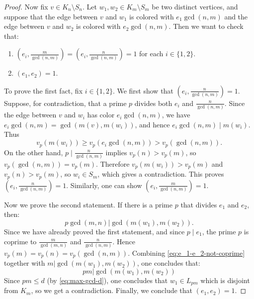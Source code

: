 \documentclass[11pt]{amsart}
\theoremstyle{remark}
\begin{document}
\begin{proof}
  
  Now fix $v\in K_n\setminus S_n$. Let $w_1,w_2\in K_m\setminus S_m$ be two distinct vertices, and suppose that the edge between $v$ and $w_1$ is colored with $e_1\gcd(n,m)$ and the edge between $v$ and $w_2$ is colored with $e_2\gcd(n,m)$. Then we want to check that:
  \begin{enumerate}
    \item $(e_i, \frac{m}{\gcd(n,m)}) = (e_i, \frac{n}{\gcd(n,m)}) = 1$ for each $i \in \{1, 2\}$.
    \item $(e_1, e_2) = 1$.
  \end{enumerate}
  To prove the first fact, fix $i\in\{1,2\}$. We first show that $(e_i,\frac{n}{\gcd(n,m)})=1$. Suppose, for contradiction, that a prime $p$ divides both $e_i$ and $\frac{n}{\gcd(n,m)}$. Since the edge between $v$ and $w_i$ has color $e_i\gcd(n,m)$, we have $e_i\gcd(n,m)=\gcd(m(v),m(w_i))$, and hence $e_i\gcd(n,m)\mid m(w_i)$. Thus
  \[
    v_p(m(w_i))\geq v_p(e_i\gcd(n,m))>v_p(\gcd(n,m)).
  \]
  On the other hand, $p\mid \frac{n}{\gcd(n,m)}$ implies $v_p(n)>v_p(m)$, so $v_p(\gcd(n,m))=v_p(m)$. Therefore $v_p(m(w_i))>v_p(m)$ and $v_p(n)>v_p(m)$, so $w_i\in S_m$, which gives a contradiction. This proves $(e_i,\frac{n}{\gcd(n,m)})=1$. Similarly, one can show $(e_i,\frac{m}{\gcd(n,m)})=1$.

  Now we prove the second statement. If there is a prime $p$ that divides $e_1$ and $e_2$, then: 
  \begin{equation} \label{eq:e_1-e_2-not-coprime}
    p \gcd(m,n) | \gcd(m(w_1), m(w_2)).
  \end{equation}
  Since we have already proved the first statement, and since $p\mid e_1$, the prime $p$ is coprime to $\frac{m}{\gcd(m, n)}$ and $\frac{n}{\gcd(n, m)}$. Hence $v_p(m) = v_p(n) = v_p(\gcd(n, m))$. Combining \eqref{eq:e_1-e_2-not-coprime} together with $m | \gcd(m(w_1), m(w_2))$, one concludes that:
  \begin{equation}
    pm | \gcd(m(w_1), m(w_2))
  \end{equation}
  Since $pm \leq d$ (by \eqref{eq:max-gcd-d}), one concludes that $w_1 \in L_{pm}$ which is disjoint from $K_m$, so we get a contradiction. Finally, we conclude that $(e_1, e_2) = 1$.



\end{proof}
\end{document}
